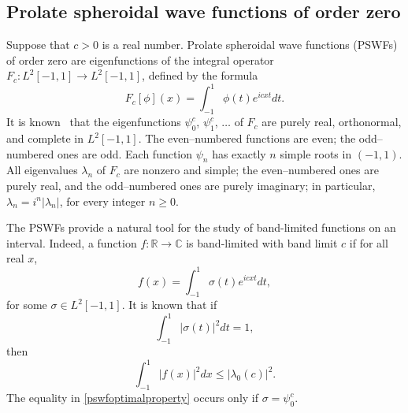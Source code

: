 \documentclass[final,letterpaper]{siamart171218}
\newcommand{\be}{\begin{equation}}
\newcommand{\ee}{\end{equation}}
\begin{document}
\subsection{Prolate spheroidal wave functions of order zero}

Suppose that $c>0$ is a real number.
Prolate spheroidal wave functions (PSWFs) of order zero are eigenfunctions of 
the integral operator
$F_c: L^2[-1,1] \rightarrow L^2[-1,1]$, defined by the formula
\be\label{pswfintegraloperator}
F_c[\phi](x) = \int_{-1}^1 \phi(t)e^{icxt}dt.
\ee
It is known~\cite{osipov2013}
that the eigenfunctions $\psi_0^c$, $\psi_1^c$, $\ldots$ of $F_c$ are purely
real, orthonormal, and complete in $L^2[-1, 1]$. The even--numbered functions are
even; the odd--numbered ones are odd. Each function $\psi_n$ has exactly $n$ simple
roots in $(-1, 1)$. All eigenvalues $\lambda_n$ of $F_c$ are nonzero and simple; the
even--numbered ones are purely real, and the odd--numbered ones are purely imaginary;
in particular, $\lambda_n = i^n |\lambda_n|$, for every integer $n\ge 0$.

The PSWFs provide a natural tool for the study of band-limited functions on an interval.
Indeed, a function $f:\mathbb{R}\rightarrow \mathbb{C}$ is band-limited with band limit $c$
if for all real $x$,
\be
f(x)=\int_{-1}^1 \sigma(t)e^{icxt}dt,
\ee
for some $\sigma\in L^2[-1,1]$. It is known that if
\be
\int_{-1}^1 |\sigma(t)|^2dt=1,
\ee
then
\be\label{pswfoptimalproperty}
\int_{-1}^1 |f(x)|^2dx\le |\lambda_0(c)|^2.
\ee
The equality in \eqref{pswfoptimalproperty} occurs only if $\sigma=\psi_0^c$. 
\end{document}
